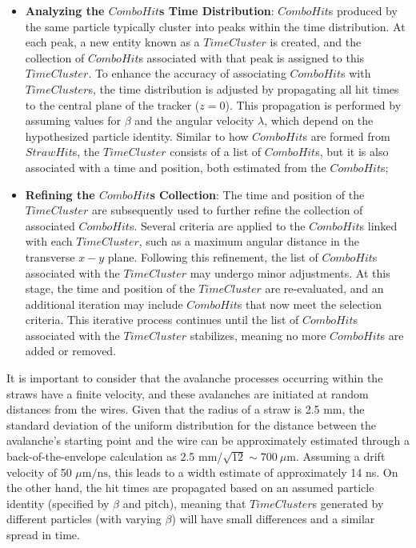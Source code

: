 \begin{itemize}
\item \textbf{Analyzing the $ComboHit$s Time Distribution}: 
$ComboHit$s produced by the same particle typically cluster 
into peaks within the time distribution. At each peak, a new 
entity known as a $TimeCluster$ is created, and the collection 
of $ComboHit$s associated with that peak is assigned to this 
$TimeCluster$. To enhance the accuracy of associating $ComboHit$s 
with $TimeCluster$s, the time distribution is adjusted by 
propagating all hit times to the central plane of the tracker 
($z = 0$). This propagation is performed by assuming values for 
$\beta$ and the angular velocity $\lambda$, which depend on the 
hypothesized particle identity. Similar to how $ComboHit$s are 
formed from $StrawHit$s, the $TimeCluster$ consists of a list of 
$ComboHit$s, but it is also associated with a time and position, 
both estimated from the $ComboHit$s;
\item \textbf{Refining the $ComboHit$s Collection}: The time and 
position of the $TimeCluster$ are subsequently used to further 
refine the collection of associated $ComboHit$s. Several criteria 
are applied to the $ComboHit$s linked with each $TimeCluster$, 
such as a maximum angular distance in the transverse $x-y$ plane. 
Following this refinement, the list of $ComboHit$s associated with 
the $TimeCluster$ may undergo minor adjustments. At this stage, 
the time and position of the $TimeCluster$ are re-evaluated, and 
an additional iteration may include $ComboHit$s that now meet 
the selection criteria. This iterative process continues until 
the list of $ComboHit$s associated with the $TimeCluster$ 
stabilizes, meaning no more $ComboHit$s are added or removed.

\end{itemize}
It is important to consider that the avalanche processes 
occurring within the straws have a finite velocity, and 
these avalanches are initiated at random distances from 
the wires. Given that the radius of a straw is 2.5 mm, 
the standard deviation of the uniform distribution for 
the distance between the avalanche's starting point and 
the wire can be approximately estimated through a 
back-of-the-envelope calculation as 2.5 mm/$\sqrt{12} \sim 700 \ \mu$m. 
Assuming a drift velocity of 50 $\mu\text{m}/\text{ns}$, this leads 
to a width estimate of approximately 14 ns. On the other hand, the 
hit times are propagated based on an assumed particle identity 
(specified by $\beta$ and pitch), meaning that $TimeCluster$s 
generated by different particles (with varying $\beta$) will 
have small differences and a similar spread in time.

